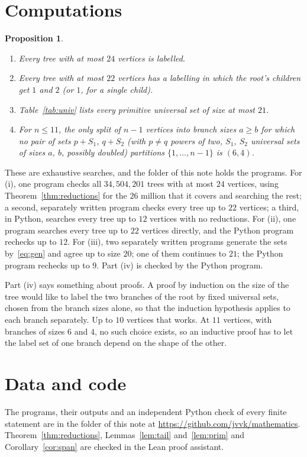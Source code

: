 \documentclass[11pt]{article}
\newtheorem{proposition}[theorem]{Proposition}
\theoremstyle{remark}
\begin{document}
\section{Computations}\label{sec:comp}

\begin{proposition}\label{prop:comp}
\begin{enumerate}
\item[(i)] Every tree with at most $24$ vertices is labelled.
\item[(ii)] Every tree with at most $22$ vertices has a labelling in which the root's children get
$1$ and $2$ (or $1$, for a single child).
\item[(iii)] Table~\ref{tab:univ} lists every primitive universal set of size at most $21$.
\item[(iv)] For $n\le11$, the only split of $n-1$ vertices into branch sizes $a\ge b$ for which no
pair of sets $p+S_1$, $q+S_2$ (with $p\ne q$ powers of two, $S_1$, $S_2$ universal sets of sizes
$a$, $b$, possibly doubled) partitions $\{1,\dots,n-1\}$ is $(6,4)$.
\end{enumerate}
\end{proposition}

These are exhaustive searches, and the folder of this note holds the programs. For (i), one
program checks all $34{,}504{,}201$ trees with at most $24$ vertices, using
Theorem~\ref{thm:reductions} for the $26$ million that it covers and searching the rest; a
second, separately written program checks every tree up to $22$ vertices; a third, in Python,
searches every tree up to $12$ vertices with no reductions. For (ii), one program searches every
tree up to $22$ vertices directly, and the Python program rechecks up to $12$. For (iii), two
separately written programs generate the sets by~\eqref{eq:gen} and agree up to size $20$; one
of them continues to $21$; the Python program rechecks up to $9$. Part (iv) is checked by the
Python program.

Part (iv) says something about proofs. A proof by induction on the size of the tree would like to
label the two branches of the root by fixed universal sets, chosen from the branch sizes alone,
so that the induction hypothesis applies to each branch separately. Up to $10$ vertices that
works. At $11$ vertices, with branches of sizes $6$ and $4$, no such choice exists, so an
inductive proof has to let the label set of one branch depend on the shape of the other.

\section*{Data and code}
The programs, their outputs and an independent Python check of every finite statement are in
the folder of this note at \url{https://github.com/jvvk/mathematics}. Theorem~\ref{thm:reductions},
Lemmas~\ref{lem:tail} and~\ref{lem:prim} and Corollary~\ref{cor:span} are checked in the Lean
proof assistant.
\end{document}
